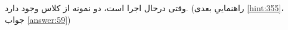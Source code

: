 \section{}
\paragraph{}\label{hint:329}
وقتی  درحال اجرا است، دو نمونه از کلاس  وجود دارد. (راهنماییِ بعدی \ref{hint:355}، جواب \ref{answer:59})